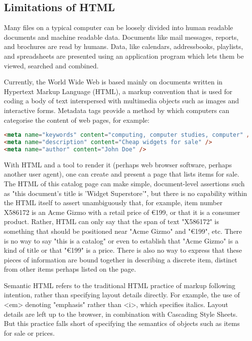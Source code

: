\subsection{Limitations of HTML}

Many files on a typical computer can be loosely divided into human readable documents and machine readable data. Documents like mail messages, reports, and brochures are read by humans. Data, like calendars, addressbooks, playlists, and spreadsheets are presented using an application program which lets them be viewed, searched and combined.

Currently, the World Wide Web is based mainly on documents written in Hypertext Markup Language (HTML), a markup convention that is used for coding a body of text interspersed with multimedia objects such as images and interactive forms. Metadata tags provide a method by which computers can categorise the content of web pages, for example:


\begin{lstlisting}[language=HTML]
<meta name="keywords" content="computing, computer studies, computer" />
<meta name="description" content="Cheap widgets for sale" />
<meta name="author" content="John Doe" />
\end{lstlisting}

With HTML and a tool to render it (perhaps web browser software, perhaps another user agent), one can create and present a page that lists items for sale. The HTML of this catalog page can make simple, document-level assertions such as "this document's title is 'Widget Superstore'", but there is no capability within the HTML itself to assert unambiguously that, for example, item number X586172 is an Acme Gizmo with a retail price of €199, or that it is a consumer product. Rather, HTML can only say that the span of text "X586172" is something that should be positioned near "Acme Gizmo" and "€199", etc. There is no way to say "this is a catalog" or even to establish that "Acme Gizmo" is a kind of title or that "€199" is a price. There is also no way to express that these pieces of information are bound together in describing a discrete item, distinct from other items perhaps listed on the page.

Semantic HTML refers to the traditional HTML practice of markup following intention, rather than specifying layout details directly. For example, the use of <em> denoting "emphasis" rather than <i>, which specifies italics. Layout details are left up to the browser, in combination with Cascading Style Sheets. But this practice falls short of specifying the semantics of objects such as items for sale or prices.

